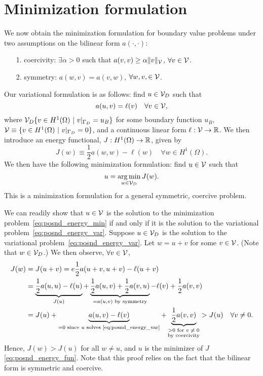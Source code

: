 \section{Minimization formulation}
We now obtain the minimization formulation for boundary value problems under two assumptions on the bilinear form $a(\cdot,\cdot)$:
\begin{itemize}
\item[1.] coercivity: $\exists \alpha > 0$ such that $a(v,v) \geq \alpha\| v \|_{\mathcal{V}}$, $\forall v \in \mathcal{V}$.
\item[2.] symmetry: $a(w,v) = a(v,w)$, $\forall w,v, \in \mathcal{V}$.
\end{itemize}
Our variational formulation is as follows: find $u \in \mathcal{V}_D$ such that
\begin{equation}
  a(u,v) = \ell(v) \quad \forall v \in \mathcal{V},
  \label{eq:posnd_energy_var}
\end{equation}
where $\mathcal{V}_D  \{ v \in H^1(\Omega) \ | \ v|_{\Gamma_D} = u_B\}$ for some boundary function $u_B$, $ \calV \equiv \{ v \in H^1(\Omega) \ | \ v|_{\Gamma_D} = 0 \}$, and a continuous linear form $\ell: \mathcal{V} \to \mathbb{R}$.
  We then introduce an energy functional, $J: H^1(\Omega) \to \mathbb{R}$, given by
\begin{equation}
  J(w) \equiv \frac{1}{2} a(w,w) - \ell(w) \quad \forall w \in H^1(\Omega).
  \label{eq:posnd_energy_fun}
\end{equation}
 We then have the following minimization formulation: find $u \in \mathcal{V}$ such that
\begin{equation}
  u = \operatorname*{arg\,min}_{w \in \mathcal{V}_D} J(w).
  \label{eq:posnd_energy_min}
\end{equation}
This is a minimization formulation for a general symmetric, coercive problem.

We can readily show that $u \in \mathcal{V}$ is the solution to the minimization problem~\eqref{eq:posnd_energy_min} if and only if it is the solution to the variational problem~\eqref{eq:posnd_energy_var}. Suppose $u \in \mathcal{V}_D$ is the solution to the variational problem~\eqref{eq:posnd_energy_var}. Let $w = u + v$ for some $v \in \mathcal{V}$.  (Note that $w \in \mathcal{V}_D$.)  We then observe, $\forall v \in \mathcal{V}$,
\begin{align*}
  J(w)
  &=
  J(u+v)
  =
  e\frac{1}{2} a(u+v,u+v) - \ell(u+v)
  \\
  &=
  \underbrace{\frac{1}{2} a(u,u) - \ell(u)}_{J(u)} + \underbrace{ \frac{1}{2} a(u,v) + \frac{1}{2} a(v,u)}_{= a(u,v) \text{ by symmetry}} - \ell(v) + \frac{1}{2} a(v,v)
  \\
  &=
  J(u) + \underbrace{ a(u,v) - \ell(v) }_{= 0 \text{ since $u$ solves \eqref{eq:posnd_energy_var}}} + \underbrace{ \frac{1}{2} a(v,v) }_{\substack{> 0 \text{ for $v \neq 0$}\\\text{by coercivity}}} > J(u) \quad \forall v \neq 0.
\end{align*}
Hence, $J(w) > J(u)$ for all $w \neq u$, and $u$ is the minimizer of $J$ \eqref{eq:posnd_energy_fun}.  Note that this proof relies on the fact that the bilinear form is symmetric and coercive.

